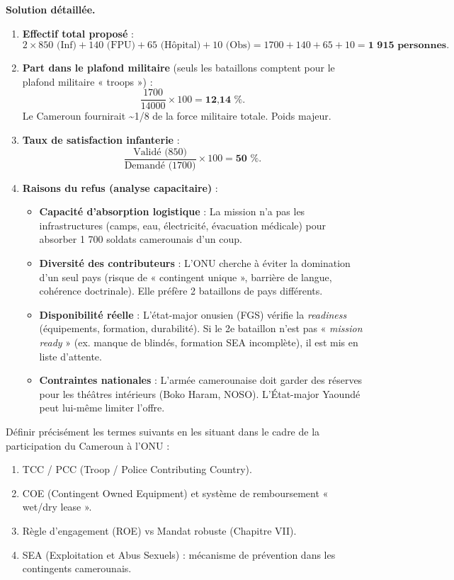 \documentclass[11pt]{article}
\newcounter{popsec}
\newcounter{popsub}
\newcommand{\courssub}[1]{%
  \stepcounter{popsub}%
  \par\vspace{9pt}\noindent{\popxbold\fontsize{11.5}{13}\selectfont\color{popink}{\color{poporange}\thepopsec.\thepopsub}\hspace{6pt}#1}\par\nopagebreak\vspace{4pt}
}
\begin{document}
\begin{exoresolu}
\tcblower
\textbf{Solution détaillée.}
\begin{enumerate}
    \item \textbf{Effectif total proposé} :
    \[ 2 \times 850 \text{ (Inf)} + 140 \text{ (FPU)} + 65 \text{ (Hôpital)} + 10 \text{ (Obs)} = 1700 + 140 + 65 + 10 = \textbf{1 915 personnes}. \]
    \item \textbf{Part dans le plafond militaire} (seuls les bataillons comptent pour le plafond militaire « troops ») :
    \[ \frac{1700}{14000} \times 100 = \textbf{12,14 \%}. \]
    Le Cameroun fournirait \textasciitilde 1/8 de la force militaire totale. Poids majeur.
    \item \textbf{Taux de satisfaction infanterie} :
    \[ \frac{\text{Validé (850)}}{\text{Demandé (1700)}} \times 100 = \textbf{50 \%}. \]
    \item \textbf{Raisons du refus (analyse capacitaire)} :
    \begin{itemize}
        \item \textbf{Capacité d'absorption logistique} : La mission n'a pas les infrastructures (camps, eau, électricité, évacuation médicale) pour absorber 1 700 soldats camerounais d'un coup.
        \item \textbf{Diversité des contributeurs} : L'ONU cherche à éviter la domination d'un seul pays (risque de « contingent unique », barrière de langue, cohérence doctrinale). Elle préfère 2 bataillons de pays différents.
        \item \textbf{Disponibilité réelle} : L'état-major onusien (FGS) vérifie la \emph{readiness} (équipements, formation, durabilité). Si le 2e bataillon n'est pas « \emph{mission ready} » (ex. manque de blindés, formation SEA incomplète), il est mis en liste d'attente.
        \item \textbf{Contraintes nationales} : L'armée camerounaise doit garder des réserves pour les théâtres intérieurs (Boko Haram, NOSO). L'État-major Yaoundé peut lui-même limiter l'offre.
    \end{itemize}
\end{enumerate}
\end{exoresolu}

\courssub{Exercices d'application}

\begin{exercice}
Définir précisément les termes suivants en les situant dans le cadre de la participation du Cameroun à l'ONU :
\begin{enumerate}
    \item TCC / PCC (Troop / Police Contributing Country).
    \item COE (Contingent Owned Equipment) et système de remboursement « wet/dry lease ».
    \item Règle d'engagement (ROE) vs Mandat robuste (Chapitre VII).
    \item SEA (Exploitation et Abus Sexuels) : mécanisme de prévention dans les contingents camerounais.
\end{enumerate}
\end{exercice}
\end{document}
